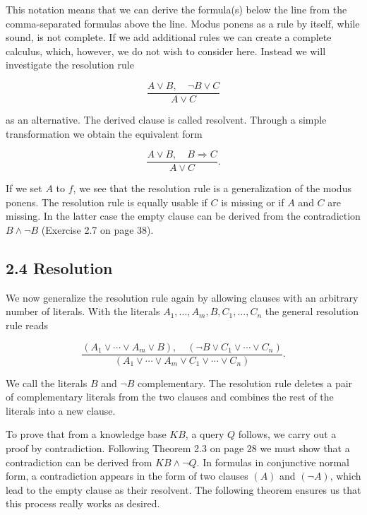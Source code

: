 \documentclass[10pt]{article}
\begin{document}
This notation means that we can derive the formula(s) below the line from the comma-separated formulas above the line. Modus ponens as a rule by itself, while sound, is not complete. If we add additional rules we can create a complete calculus, which, however, we do not wish to consider here. Instead we will investigate the resolution rule


\begin{equation*}
\frac{A \vee B, \quad \neg B \vee C}{A \vee C} \tag{2.1}
\end{equation*}


as an alternative. The derived clause is called resolvent. Through a simple transformation we obtain the equivalent form

$$
\frac{A \vee B, \quad B \Rightarrow C}{A \vee C} .
$$

If we set $A$ to $f$, we see that the resolution rule is a generalization of the modus ponens. The resolution rule is equally usable if $C$ is missing or if $A$ and $C$ are missing. In the latter case the empty clause can be derived from the contradiction $B \wedge \neg B$ (Exercise 2.7 on page 38).

\subsection*{2.4 Resolution}
We now generalize the resolution rule again by allowing clauses with an arbitrary number of literals. With the literals $A_{1}, \ldots, A_{m}, B, C_{1}, \ldots, C_{n}$ the general resolution rule reads


\begin{equation*}
\frac{\left(A_{1} \vee \cdots \vee A_{m} \vee B\right), \quad\left(\neg B \vee C_{1} \vee \cdots \vee C_{n}\right)}{\left(A_{1} \vee \cdots \vee A_{m} \vee C_{1} \vee \cdots \vee C_{n}\right)} . \tag{2.2}
\end{equation*}


We call the literals $B$ and $\neg B$ complementary. The resolution rule deletes a pair of complementary literals from the two clauses and combines the rest of the literals into a new clause.

To prove that from a knowledge base $K B$, a query $Q$ follows, we carry out a proof by contradiction. Following Theorem 2.3 on page 28 we must show that a contradiction can be derived from $K B \wedge \neg Q$. In formulas in conjunctive normal form, a contradiction appears in the form of two clauses $(A)$ and $(\neg A)$, which lead to the empty clause as their resolvent. The following theorem ensures us that this process really works as desired.
\end{document}
